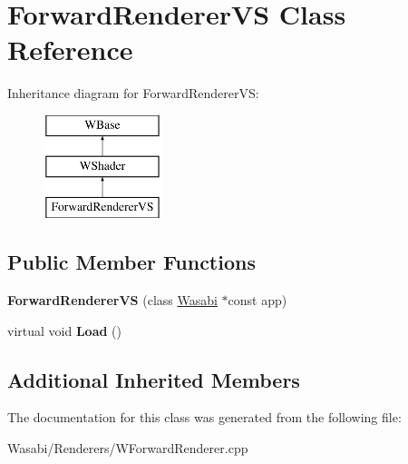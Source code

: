 \hypertarget{class_forward_renderer_v_s}{}\section{Forward\+Renderer\+VS Class Reference}
\label{class_forward_renderer_v_s}
Inheritance diagram for Forward\+Renderer\+VS\+:\begin{figure}[H]
\begin{center}
\leavevmode
\includegraphics[height=3.000000cm]{class_forward_renderer_v_s}
\end{center}
\end{figure}
\subsection*{Public Member Functions}
\begin{DoxyCompactItemize}
\item 
{\bfseries Forward\+Renderer\+VS} (class \hyperlink{class_wasabi}{Wasabi} $\ast$const app)\hypertarget{class_forward_renderer_v_s_a25e4ba73eaef23c09749690ca1d1735f}{}\label{class_forward_renderer_v_s_a25e4ba73eaef23c09749690ca1d1735f}

\item 
virtual void {\bfseries Load} ()\hypertarget{class_forward_renderer_v_s_a68964f98fe8bec8f0addf39a4fcbe9fa}{}\label{class_forward_renderer_v_s_a68964f98fe8bec8f0addf39a4fcbe9fa}

\end{DoxyCompactItemize}
\subsection*{Additional Inherited Members}


The documentation for this class was generated from the following file\+:\begin{DoxyCompactItemize}
\item 
Wasabi/\+Renderers/W\+Forward\+Renderer.\+cpp\end{DoxyCompactItemize}
